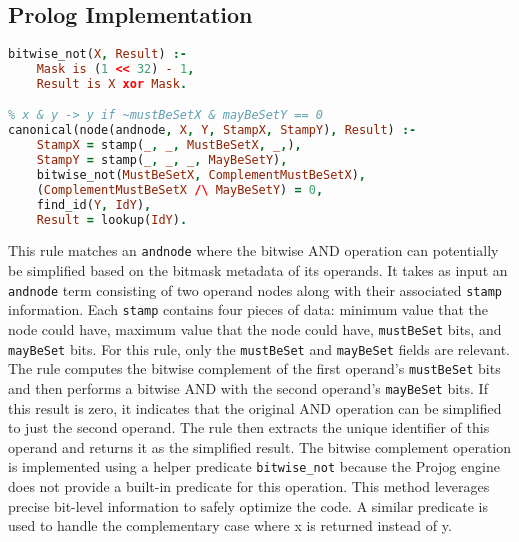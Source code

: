 \subsection*{Prolog Implementation}
\begin{lstlisting}[language=Prolog]
% Complement of a bitmask
bitwise_not(X, Result) :-
    Mask is (1 << 32) - 1,
    Result is X xor Mask.

% x & y -> y if ~mustBeSetX & mayBeSetY == 0
canonical(node(andnode, X, Y, StampX, StampY), Result) :-
    StampX = stamp(_, _, MustBeSetX, _,),
    StampY = stamp(_, _, _, MayBeSetY),
    bitwise_not(MustBeSetX, ComplementMustBeSetX),
    (ComplementMustBeSetX /\ MayBeSetY) = 0,
    find_id(Y, IdY),
    Result = lookup(IdY).
\end{lstlisting}
This rule matches an \texttt{andnode} where the bitwise AND operation can potentially be simplified based on the bitmask metadata of its operands. 
It takes as input an \texttt{andnode} term consisting of two operand nodes along with their associated \texttt{stamp} information. 
Each \texttt{stamp} contains four pieces of data: minimum value that the node could have, maximum value that the node could have, \texttt{mustBeSet} bits, and \texttt{mayBeSet} bits. 
For this rule, only the \texttt{mustBeSet} and \texttt{mayBeSet} fields are relevant. 
The rule computes the bitwise complement of the first operand’s \texttt{mustBeSet} bits and then performs a bitwise AND with the second operand’s \texttt{mayBeSet} bits. 
If this result is zero, it indicates that the original AND operation can be simplified to just the second operand. 
The rule then extracts the unique identifier of this operand and returns it as the simplified result. 
The bitwise complement operation is implemented using a helper predicate \texttt{bitwise\_not} because the Projog engine does not provide a built-in predicate for this operation. 
This method leverages precise bit-level information to safely optimize the code.
A similar predicate is used to handle the complementary case where x is returned instead of y.
